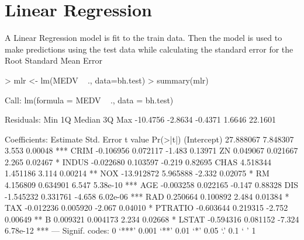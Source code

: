 \documentclass{article}
\begin{document}
\section*{Linear Regression}
A Linear Regression model is fit to the train data. Then the model is used to make predictions using the test data while calculating the standard error for the Root Standard Mean Error
\begin{Schunk}
\begin{Sinput}
> mlr <- lm(MEDV ~ ., data=bh.test)
> summary(mlr)
\end{Sinput}
\begin{Soutput}
Call:
lm(formula = MEDV ~ ., data = bh.test)

Residuals:
     Min       1Q   Median       3Q      Max 
-10.4756  -2.8634  -0.4371   1.6646  22.1601 

Coefficients:
              Estimate Std. Error t value Pr(>|t|)    
(Intercept)  27.888067   7.848307   3.553  0.00048 ***
CRIM         -0.106956   0.072117  -1.483  0.13971    
ZN            0.049067   0.021667   2.265  0.02467 *  
INDUS        -0.022680   0.103597  -0.219  0.82695    
CHAS          4.518344   1.451186   3.114  0.00214 ** 
NOX         -13.912872   5.965888  -2.332  0.02075 *  
RM            4.156809   0.634901   6.547 5.38e-10 ***
AGE          -0.003258   0.022165  -0.147  0.88328    
DIS          -1.545232   0.331761  -4.658 6.02e-06 ***
RAD           0.250664   0.100892   2.484  0.01384 *  
TAX          -0.012236   0.005920  -2.067  0.04010 *  
PTRATIO      -0.603644   0.219315  -2.752  0.00649 ** 
B             0.009321   0.004173   2.234  0.02668 *  
LSTAT        -0.594316   0.081152  -7.324 6.78e-12 ***
---
Signif. codes:  0 ‘***’ 0.001 ‘**’ 0.01 ‘*’ 0.05 ‘.’ 0.1 ‘ ’ 1


\end{Soutput}
\end{Schunk}
\end{document}
